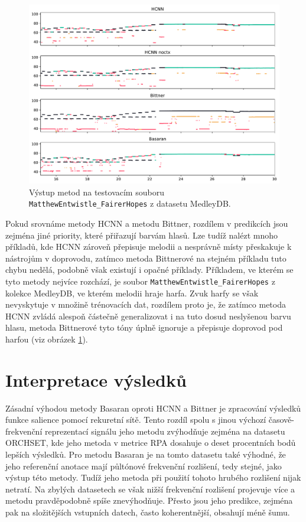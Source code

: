 \begin{figure}[h]\centering
\includegraphics[width=\textwidth,height=\textheight,keepaspectratio]{../img/vysledky/mdb_MatthewEntwistle_FairerHopes}
\caption{Výstup metod na testovacím souboru \texttt{Matthew\allowbreak{}Entwistle\allowbreak{}\_Fairer\allowbreak{}Hopes} z datasetu MedleyDB.}
\label{obr:mdb_MatthewEntwistle_FairerHopes}
\end{figure}
Pokud srovnáme metody HCNN a metodu Bittner, rozdílem v predikcích jsou zejména jiné priority, které přiřazují barvám hlasů. Lze tudíž nalézt mnoho příkladů, kde HCNN zároveň přepisuje melodii a nesprávně místy přeskakuje k nástrojům v doprovodu, zatímco metoda Bittnerové na stejném příkladu tuto chybu nedělá, podobně však existují i opačné příklady. Příkladem, ve kterém se tyto metody nejvíce rozchází, je soubor \texttt{MatthewEntwistle\_FairerHopes} z kolekce MedleyDB, ve kterém melodii hraje harfa. Zvuk harfy se však nevyskytuje v množině trénovacích dat, rozdílem proto je, že zatímco metoda HCNN zvládá alespoň částečně generalizovat i na tuto dosud neslyšenou barvu hlasu, metoda Bittnerové tyto tóny úplně ignoruje a přepisuje doprovod pod harfou (viz obrázek \ref{obr:mdb_MatthewEntwistle_FairerHopes}).

\section{Interpretace výsledků}

Zásadní výhodou metody Basaran oproti HCNN a Bittner je zpracování výsledků funkce salience pomocí rekuretní sítě. Tento rozdíl spolu s jinou výchozí časově-frekvenční reprezentací signálu jeho metodu zvýhodňuje zejména na datasetu ORCHSET, kde jeho metoda v metrice RPA dosahuje o deset procentních bodů lepších výsledků. Pro metodu Basaran je na tomto datasetu také výhodné, že jeho referenční anotace mají půltónové frekvenční rozlišení, tedy stejné, jako výstup této metody. Tudíž jeho metoda při použití tohoto hrubého rozlišení nijak netratí. Na zbylých datasetech se však nižší frekvenční rozlišení projevuje více a metodu pravděpodobně spíše znevýhodňuje. Přesto jsou jeho predikce, zejména pak na složitějších vstupních datech, často koherentnější, obsahují méně šumu. 

